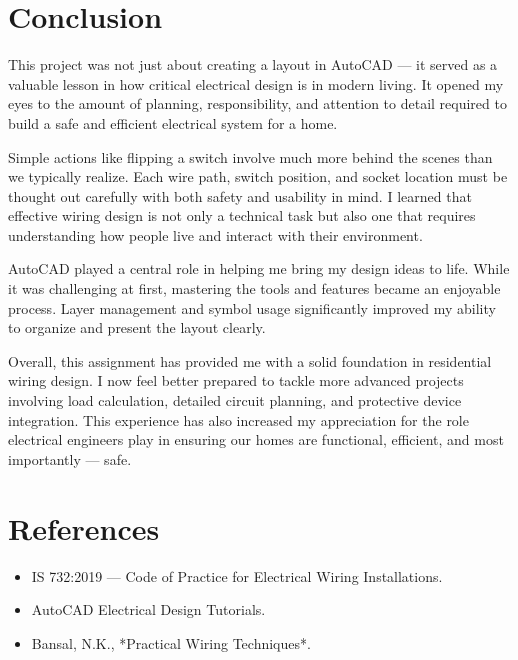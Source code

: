 \documentclass[12pt]{article}
\begin{document}
\newpage

\section*{Conclusion}
This project was not just about creating a layout in AutoCAD — it served as a valuable lesson in how critical electrical design is in modern living. It opened my eyes to the amount of planning, responsibility, and attention to detail required to build a safe and efficient electrical system for a home.

Simple actions like flipping a switch involve much more behind the scenes than we typically realize. Each wire path, switch position, and socket location must be thought out carefully with both safety and usability in mind. I learned that effective wiring design is not only a technical task but also one that requires understanding how people live and interact with their environment.

AutoCAD played a central role in helping me bring my design ideas to life. While it was challenging at first, mastering the tools and features became an enjoyable process. Layer management and symbol usage significantly improved my ability to organize and present the layout clearly.

Overall, this assignment has provided me with a solid foundation in residential wiring design. I now feel better prepared to tackle more advanced projects involving load calculation, detailed circuit planning, and protective device integration. This experience has also increased my appreciation for the role electrical engineers play in ensuring our homes are functional, efficient, and most importantly — safe.

\section*{References}
\begin{itemize}
    \item IS 732:2019 — Code of Practice for Electrical Wiring Installations.
    \item AutoCAD Electrical Design Tutorials.
    \item Bansal, N.K., *Practical Wiring Techniques*.
\end{itemize}
\end{document}
